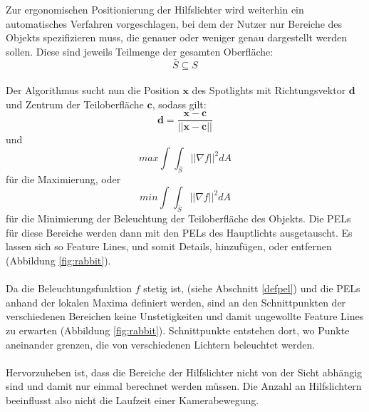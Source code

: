 \documentclass{paperStyle}
\begin{document}
Zur ergonomischen Positionierung der Hilfslichter wird weiterhin ein automatisches Verfahren vorgeschlagen, bei dem der Nutzer nur Bereiche des Objekts spezifizieren muss, die genauer oder weniger genau dargestellt werden sollen. Diese sind jeweils Teilmenge der gesamten Oberfläche:
\begin{equation}
\bar{S} \subseteq S
\label{eq:ssubsets}
\end{equation}
\\
Der Algorithmus sucht nun die Position $\mathbf{x}$ des Spotlights mit Richtungsvektor $\mathbf{d}$ und Zentrum der Teiloberfläche $\mathbf{c}$, sodass gilt:
\begin{equation}
\mathbf{d} = \frac{\mathbf{x} - \mathbf{c}}{||\mathbf{x} - \mathbf{c}||}
\end{equation}
und
\begin{equation}
max \int_{}\int_{\bar{S}} || \nabla f||^{2} dA 
\end{equation}
für die Maximierung, oder
\begin{equation}
min \int_{}\int_{\bar{S}} || \nabla f||^{2} dA 
\end{equation}
für die Minimierung der Beleuchtung der Teiloberfläche des Objekts. Die PELs für diese Bereiche werden dann mit den PELs des Hauptlichts ausgetauscht. 
Es lassen sich so Feature Lines, und somit Details, hinzufügen, oder entfernen (Abbildung \ref{fig:rabbit}).
\\\\
Da die Beleuchtungsfunktion $f$ stetig ist, (siehe Abschnitt \ref{defpel}) und die PELs anhand der lokalen Maxima definiert werden,
sind an den Schnittpunkten der verschiedenen Bereichen keine Unstetigkeiten und damit ungewollte Feature Lines zu erwarten (Abbildung \ref{fig:rabbit}). Schnittpunkte entstehen dort, wo Punkte aneinander grenzen, die von verschiedenen Lichtern beleuchtet werden. 
\\\\
Hervorzuheben ist, dass die Bereiche der Hilfslichter nicht von der Sicht abhängig sind und damit nur einmal berechnet werden müssen. Die Anzahl an Hilfslichtern beeinflusst also  nicht die Laufzeit einer Kamerabewegung.
\end{document}
